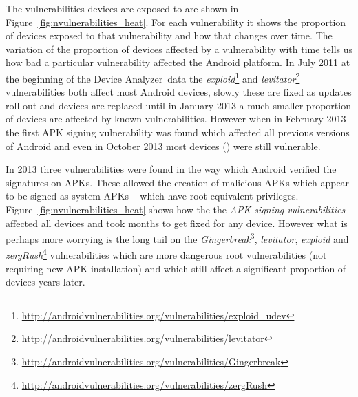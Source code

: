 \documentclass[conference,a4paper,twoside]{IEEEtran}
\newcommand{\da}{Device Analyzer}
\begin{document}
The vulnerabilities devices are exposed to are shown in Figure~\ref{fig:nvulnerabilities_heat}.
For each vulnerability it shows the proportion of devices exposed to that vulnerability and how that changes over time.
The variation of the proportion of devices affected by a vulnerability with time tells us how bad a particular vulnerability affected the Android platform.
In July 2011 at the beginning of the \da\ data the \emph{exploid}\footnote{\url{http://androidvulnerabilities.org/vulnerabilities/exploid_udev}} and \emph{levitator}\footnote{\url{http://androidvulnerabilities.org/vulnerabilities/levitator}} vulnerabilities both affect most Android devices, slowly these are fixed as updates roll out and devices are replaced until in January 2013 a much smaller proportion of devices are affected by known vulnerabilities.
However when in February 2013 the first APK signing vulnerability was found which affected all previous versions of Android and even in October 2013 most devices (\daVulnAPKDuplicateFileOctoberPerc) were still vulnerable.

In 2013 three vulnerabilities were found in the way which Android verified the signatures on APKs.
These allowed the creation of malicious APKs which appear to be signed as system APKs -- which have root equivalent privileges.
Figure~\ref{fig:nvulnerabilities_heat} shows how the the \emph{APK signing vulnerabilities} affected all devices and took months to get fixed for any device.
However what is perhaps more worrying is the long tail on the \emph{Gingerbreak}\footnote{\url{http://androidvulnerabilities.org/vulnerabilities/Gingerbreak}}, \emph{levitator}, \emph{exploid} and \emph{zergRush}\footnote{\url{http://androidvulnerabilities.org/vulnerabilities/zergRush}} vulnerabilities which are more dangerous root vulnerabilities (not requiring new APK installation) and which still affect a significant proportion of devices years later.
\end{document}
